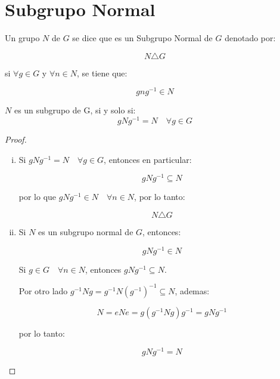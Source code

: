 \newpage
\section{Subgrupo Normal}
	\begin{definicion}
		Un grupo $N$ de $G$ se dice que es un Subgrupo Normal de $G$ denotado por:

		\begin{equation}
			N \triangle G \nonumber
		\end{equation}

		si $\forall g \in G$ y $\forall n \in N$, se tiene que:

		\begin{equation}
			g n g^{-1} \in N
		\end{equation}
	\end{definicion}

	\begin{lema}
		$N$ es un subgrupo de G, si y solo si:
		\begin{equation}
			g N g^{-1} = N \quad \forall g \in G
		\end{equation}
	\end{lema}

	\begin{proof}
		\begin{enumerate}[i)]
			\item Si $g N g^{-1} = N \quad \forall g \in G$, entonces en particular:

			\begin{equation}
				g N g^{-1} \subseteq N \nonumber
			\end{equation}

			por lo que $g N g^{-1} \in N \quad \forall n \in N$, por lo tanto:

			\begin{equation}
				N \triangle G \nonumber
			\end{equation}

			\item Si $N$ es un subgrupo normal de $G$, entonces:

			\begin{equation}
				g N g^{-1} \in N \nonumber
			\end{equation}

			Si $g \in G \quad \forall n \in N$, entonces $g N g^{-1} \subseteq N$.

			Por otro lado $g^{-1} N g = g^{-1} N (g^{-1})^{-1} \subseteq N$, ademas:

			\begin{equation}
				N = e N e = g \left( g^{-1} N g \right) g^{-1} = g N g^{-1} \nonumber
			\end{equation}

			por lo tanto:

			\begin{equation}
				g N g^{-1} = N \nonumber
			\end{equation}
		\end{enumerate}
	\end{proof}

